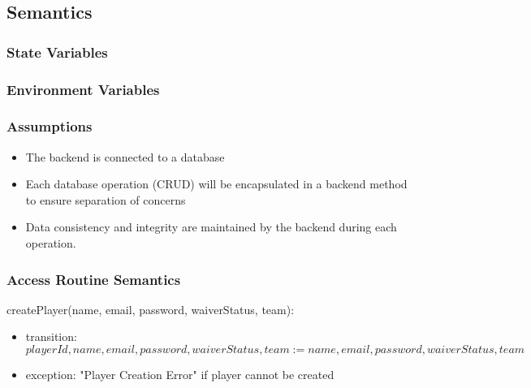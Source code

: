 \documentclass[12pt, titlepage]{article}
\begin{document}
\begin{itemize}
\subsection{Semantics}

\subsubsection{State Variables}


\subsubsection{Environment Variables}


\subsubsection{Assumptions}

\begin{itemize}
  \item The backend is connected to a database
  \item Each database operation (CRUD) will be encapsulated in a backend method to ensure separation of concerns
  \item Data consistency and integrity are maintained by the backend during each operation.

\end{itemize}

\subsubsection{Access Routine Semantics}

\noindent createPlayer(name, email, password, waiverStatus, team):
\begin{itemize}
  \item transition: $playerId, name, email, password, waiverStatus, team := name, email, password, waiverStatus, team$
  \item exception: "Player Creation Error" if player cannot be created
\end{itemize}


\end{itemize}
\end{document}
